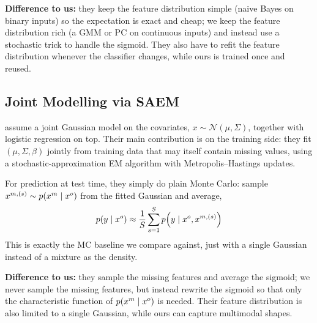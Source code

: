 \medskip
\noindent\textbf{Difference to us:} they keep the feature distribution
simple (naive Bayes on binary inputs) so the expectation is exact and
cheap; we keep the feature distribution rich (a GMM or PC on continuous
inputs) and instead use a stochastic trick to handle the sigmoid. They
also have to refit the feature distribution whenever the classifier
changes, while ours is trained once and reused.

\subsection{Joint Modelling via SAEM}

\citet{jiang2020logreg} assume a joint Gaussian model on the covariates,
$x \sim \mathcal{N}(\mu, \Sigma)$, together with logistic regression on
top. Their main contribution is on the training side: they fit
$(\mu, \Sigma, \beta)$ jointly from training data that may itself contain
missing values, using a stochastic-approximation EM algorithm with
Metropolis--Hastings updates.

For prediction at test time, they simply do plain Monte Carlo: sample
$x^{m,(s)} \sim p(x^m \mid x^o)$ from the fitted Gaussian and average,
\[
  p(y \mid x^o) \approx \frac{1}{S} \sum_{s=1}^{S} p\!\left(y \mid x^o, x^{m,(s)}\right)
\]
This is exactly the MC baseline we compare against, just with a single
Gaussian instead of a mixture as the density.

\medskip
\noindent\textbf{Difference to us:} they sample the missing features and
average the sigmoid; we never sample the missing features, but instead
rewrite the sigmoid so that only the characteristic function of
$p(x^m \mid x^o)$ is needed. Their feature distribution is also limited
to a single Gaussian, while ours can capture multimodal shapes.

